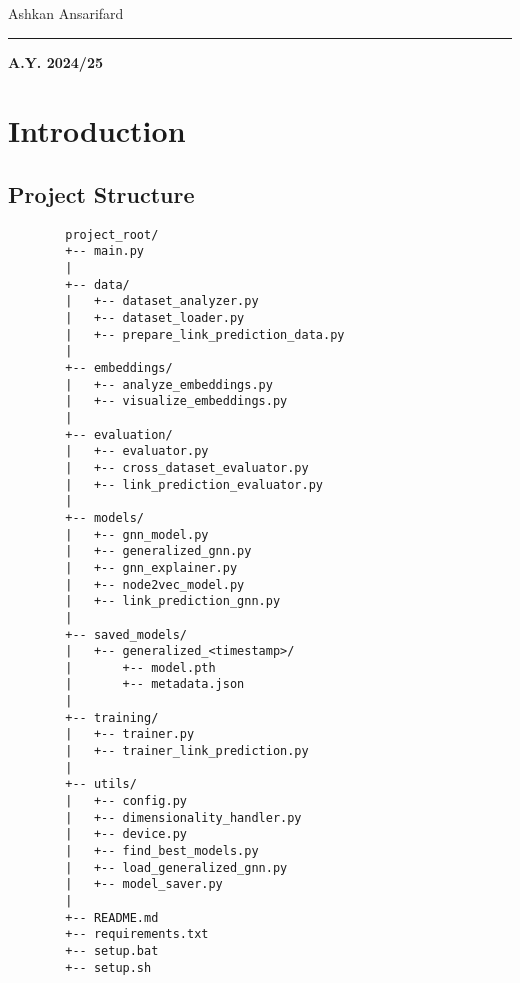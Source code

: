 	\vspace{0.5cm} 

	\begin{center}
	{\fontsize{20}{25}\selectfont Ashkan Ansarifard}
	\end{center}
	\vspace{0.5cm} 

	\begin{center}
		{\fontsize{20}{25}}
	\end{center}

	\vspace{1cm} 

	\textcolor{blue!60!black}{\rule{\linewidth}{2pt}}
	
	\vspace{8cm} 
	
	\begin{center}
	\textbf{A.Y. 2024/25}
	\end{center}

	\thispagestyle{empty}
	
	\newpage
	
	\myTOC

	\newpage
	\section{Introduction}\label{sec:intro}
	\subsection{Project Structure}\label{sec:proj-strut}
	\begin{lstlisting}
		project_root/
		+-- main.py
		|
		+-- data/
		|   +-- dataset_analyzer.py
		|   +-- dataset_loader.py
		|   +-- prepare_link_prediction_data.py
		|
		+-- embeddings/
		|   +-- analyze_embeddings.py
		|   +-- visualize_embeddings.py
		|
		+-- evaluation/
		|   +-- evaluator.py
		|   +-- cross_dataset_evaluator.py
		|   +-- link_prediction_evaluator.py
		|
		+-- models/
		|   +-- gnn_model.py
		|   +-- generalized_gnn.py
		|   +-- gnn_explainer.py
		|   +-- node2vec_model.py
		|   +-- link_prediction_gnn.py
		|
		+-- saved_models/
		|   +-- generalized_<timestamp>/
		|       +-- model.pth
		|       +-- metadata.json
		|
		+-- training/
		|   +-- trainer.py
		|   +-- trainer_link_prediction.py
		|
		+-- utils/
		|   +-- config.py
		|   +-- dimensionality_handler.py
		|   +-- device.py
		|   +-- find_best_models.py
		|   +-- load_generalized_gnn.py
		|   +-- model_saver.py
		|
		+-- README.md
		+-- requirements.txt
		+-- setup.bat
		+-- setup.sh
	\end{lstlisting}
	
